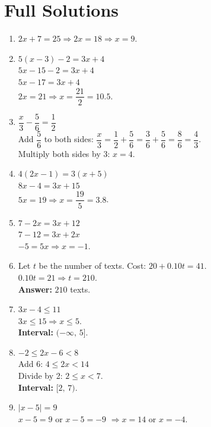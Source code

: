 \documentclass[11pt]{article}
\begin{document}
\section*{Full Solutions}
\begin{enumerate}
\item $2x + 7 = 25 \Rightarrow 2x = 18 \Rightarrow x = 9$.

\item \(5(x-3) - 2 = 3x + 4\)\\
\quad $5x - 15 - 2 = 3x + 4$\\
\quad $5x - 17 = 3x + 4$\\
\quad $2x = 21 \Rightarrow x = \dfrac{21}{2} = 10.5$.

\item \(\dfrac{x}{3} - \dfrac{5}{6} = \dfrac{1}{2}\)\\
Add $\dfrac{5}{6}$ to both sides: $\dfrac{x}{3} = \dfrac{1}{2} + \dfrac{5}{6} = \dfrac{3}{6} + \dfrac{5}{6} = \dfrac{8}{6} = \dfrac{4}{3}$.\\
Multiply both sides by 3: $x = 4$.

\item \(4(2x-1) = 3(x+5)\)\\
$8x - 4 = 3x + 15$\\
$5x = 19 \Rightarrow x = \dfrac{19}{5} = 3.8$.

\item \(7 - 2x = 3x + 12\)\\
$7 - 12 = 3x + 2x$\\
$-5 = 5x \Rightarrow x = -1$.

\item Let $t$ be the number of texts. Cost: $20 + 0.10t = 41$.\\
$0.10t = 21 \Rightarrow t = 210$.\\
\textbf{Answer:} $210$ texts.

\item \(3x - 4 \le 11\)\\
$3x \le 15 \Rightarrow x \le 5$.\\
\textbf{Interval:} $(-\infty,\,5]$.

\item \(-2 \le 2x - 6 < 8\)\\
Add 6: $4 \le 2x < 14$\\
Divide by 2: $2 \le x < 7$.\\
\textbf{Interval:} $[2,\,7)$.

\item \(|x - 5| = 9\)\\
$x - 5 = 9$ or $x - 5 = -9$ $\Rightarrow x = 14$ or $x = -4$.


\end{enumerate}
\end{document}
